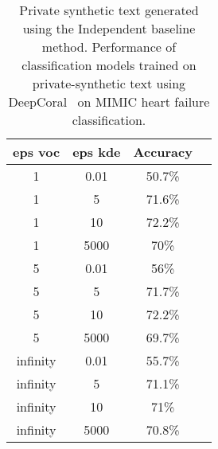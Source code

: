 \small{
\begin{table}
{
\begin{centering}
\begin{tabular}{c c c c}
\toprule
eps voc & eps kde & Accuracy \\
\midrule
\rule{0pt}{3ex}
   1 & 0.01 & 50.7\% \\
 1 & 5 & 71.6\% \\
 1 & 10 & 72.2\% \\
 1 & 5000 & 70\% \\
\hline
\rule{0pt}{3ex}
  5 & 0.01 & 56\% \\
 5 & 5 & 71.7\% \\
 5 & 10 & 72.2\% \\
 5 & 5000 & 69.7\% \\
\hline
\rule{0pt}{3ex}
  infinity & 0.01 & 55.7\% \\
 infinity & 5 & 71.1\% \\
 infinity & 10 & 71\% \\
 infinity & 5000 & 70.8\% \\
\bottomrule
\end{tabular}
\caption{ Private synthetic text generated using the Independent baseline method. Performance of classification models trained on private-synthetic text using DeepCoral~\cite{sun2016deep} on MIMIC heart failure classification.} \label{tbl:mimic_results_da}
\end{centering}}
\end{table}
}